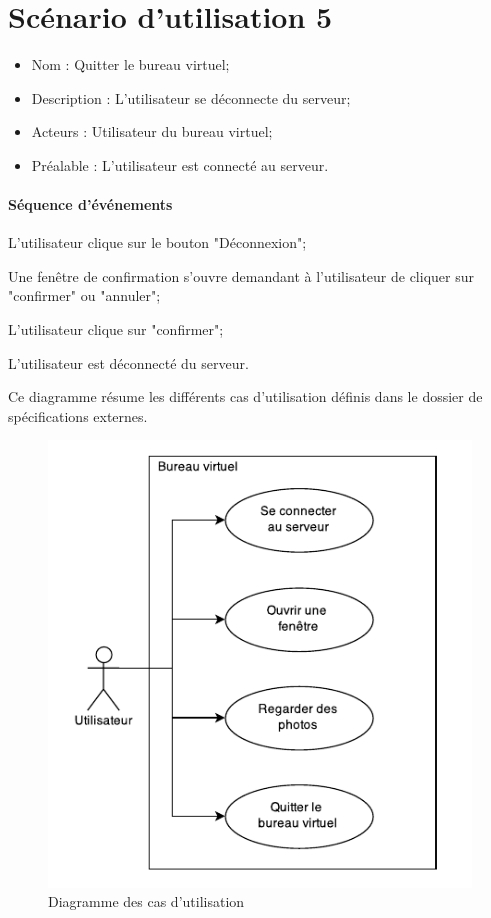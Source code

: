 
\section{Scénario d'utilisation 5}
\begin{itemize}
	\item Nom : Quitter le bureau virtuel;
	\item Description : L'utilisateur se déconnecte du serveur;
	\item Acteurs : Utilisateur du bureau virtuel;
	\item Préalable : L'utilisateur est connecté  au serveur.
\end{itemize}

\paragraph{Séquence d'événements}
\begin{itemize}
	\item L'utilisateur clique sur le bouton "Déconnexion";
	{\color{red}
	\item Une fenêtre de confirmation s'ouvre demandant à l'utilisateur de cliquer sur "confirmer" ou "annuler";
	\item L'utilisateur clique sur "confirmer";}
	\item L'utilisateur est déconnecté du serveur.
\end{itemize}

{\color{red}
Ce diagramme résume les différents cas d'utilisation définis dans le dossier de spécifications externes.

\begin{figure}[H]
	\centering
	\includegraphics[scale=0.8]{diagrammes/DCU.pdf}
	\caption{Diagramme des cas d'utilisation}
\end{figure}
}